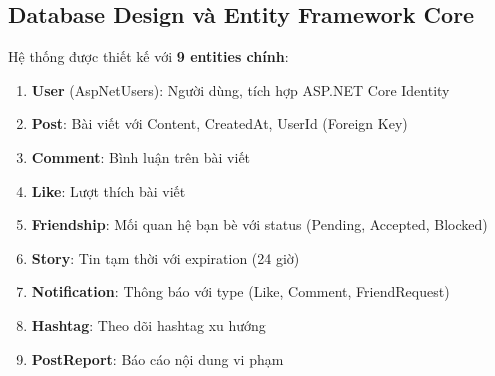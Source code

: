 \documentclass[a4paper]{article}
\begin{document}
    \subsection{Database Design và Entity Framework Core}
    Hệ thống được thiết kế với \textbf{9 entities chính}:
    \begin{enumerate}
        \item \textbf{User} (AspNetUsers): Người dùng, tích hợp ASP.NET Core Identity
        \item \textbf{Post}: Bài viết với Content, CreatedAt, UserId (Foreign Key)
        \item \textbf{Comment}: Bình luận trên bài viết
        \item \textbf{Like}: Lượt thích bài viết
        \item \textbf{Friendship}: Mối quan hệ bạn bè với status (Pending, Accepted, Blocked)
        \item \textbf{Story}: Tin tạm thời với expiration (24 giờ)
        \item \textbf{Notification}: Thông báo với type (Like, Comment, FriendRequest)
        \item \textbf{Hashtag}: Theo dõi hashtag xu hướng
        \item \textbf{PostReport}: Báo cáo nội dung vi phạm
    \end{enumerate}

\end{document}
